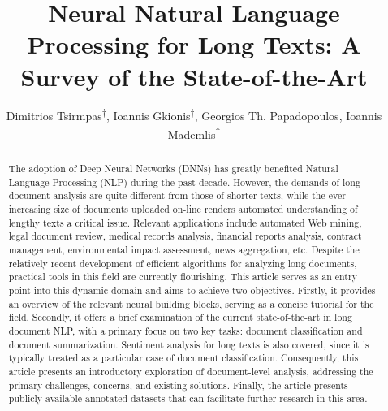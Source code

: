 \documentclass[preprint,review,10pt]{elsarticle}
\begin{document}
	
	\begin{frontmatter}
		
		\title{Neural Natural Language Processing for Long Texts: A Survey of the State-of-the-Art}
		
		\author{Dimitrios Tsirmpas\textsuperscript{$\dagger$\textsection}, Ioannis Gkionis\textsuperscript{$\dagger$\textsection}, Georgios Th. Papadopoulos\textsuperscript{\textparagraph}, Ioannis Mademlis\textsuperscript{*}\textsuperscript{\textsection}\textsuperscript{\textparagraph}}
		\address{\textsuperscript{\textsection} Department of Informatics, Athens University of Economics and Business}
		\address{\textsuperscript{\textparagraph} Department of Informatics and Telematics, Harokopio University of Athens}
		
		\begin{abstract}
			The adoption of Deep Neural Networks (DNNs) has greatly benefited Natural Language Processing (NLP) during the past decade. However, the demands of long document analysis are quite different from those of shorter texts, while the ever increasing size of documents uploaded on-line renders automated understanding of lengthy texts a critical issue. Relevant applications include automated Web mining, legal document review, medical records analysis, financial reports analysis, contract management, environmental impact assessment, news aggregation, etc. Despite the relatively recent development of efficient algorithms for analyzing long documents, practical tools in this field are currently flourishing. This article serves as an entry point into this dynamic domain and aims to achieve two objectives. Firstly, it provides an overview of the relevant neural building blocks, serving as a concise tutorial for the field. Secondly, it offers a brief examination of the current state-of-the-art in long document NLP, with a primary focus on two key tasks: document classification and document summarization. Sentiment analysis for long texts is also covered, since it is typically treated as a particular case of document classification. Consequently, this article presents an introductory exploration of document-level analysis, addressing the primary challenges, concerns, and existing solutions. Finally, the article presents publicly available annotated datasets that can facilitate further research in this area.
		\end{abstract}
		

\end{frontmatter}
\end{document}
